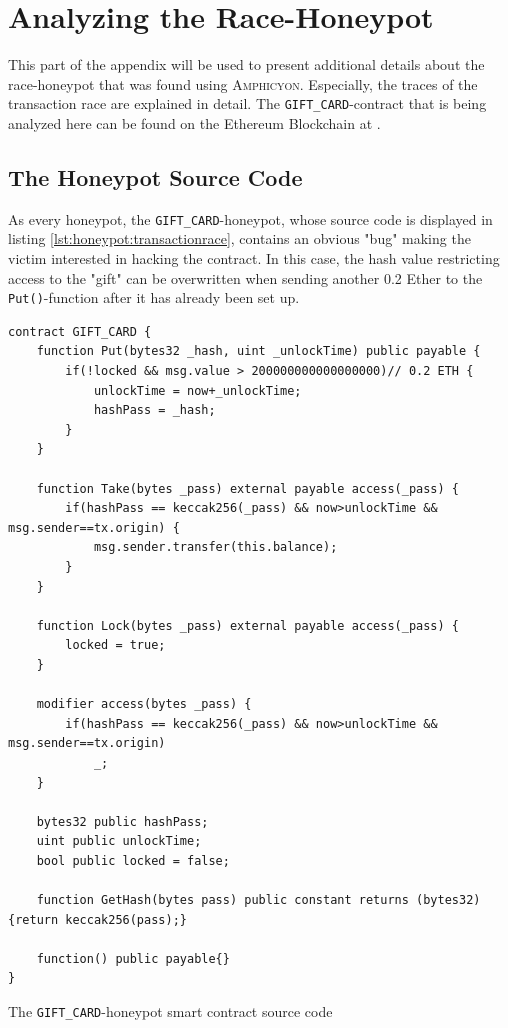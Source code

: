 \section{Analyzing the Race-Honeypot}
\label{appendix:racehoneypot}
This part of the appendix will be used to present additional details about the race-honeypot that was found using \textsc{Amphicyon}. Especially, the traces of the transaction race are explained in detail. The \texttt{GIFT_CARD}-contract that is being analyzed here can be found on the Ethereum Blockchain at \cite{etherscan:giftcard}.

\subsection{The Honeypot Source Code}
As every honeypot, the \texttt{GIFT_CARD}-honeypot, whose source code is displayed in listing \ref{lst:honeypot:transactionrace}, contains an obvious "bug" making the victim interested in hacking the contract. In this case, the hash value restricting access to the "gift" can be overwritten when sending another 0.2 Ether to the \texttt{Put()}-function after it has already been set up.

\begin{listing}[H]
	\begin{verbatim}
contract GIFT_CARD {
    function Put(bytes32 _hash, uint _unlockTime) public payable {
        if(!locked && msg.value > 200000000000000000)// 0.2 ETH {
            unlockTime = now+_unlockTime;
            hashPass = _hash;
        }
    }
    
    function Take(bytes _pass) external payable access(_pass) {
        if(hashPass == keccak256(_pass) && now>unlockTime && msg.sender==tx.origin) {
            msg.sender.transfer(this.balance);
        }
    }
    
    function Lock(bytes _pass) external payable access(_pass) {
        locked = true;
    }
    
    modifier access(bytes _pass) {
        if(hashPass == keccak256(_pass) && now>unlockTime && msg.sender==tx.origin)
            _;
    }
    
    bytes32 public hashPass;
    uint public unlockTime;
    bool public locked = false;
    
    function GetHash(bytes pass) public constant returns (bytes32) {return keccak256(pass);}
    
    function() public payable{}
}
    \end{verbatim}
	\caption{The \texttt{GIFT_CARD}-honeypot smart contract source code}
	\label{lst:appendix:giftcard}
\end{listing}

